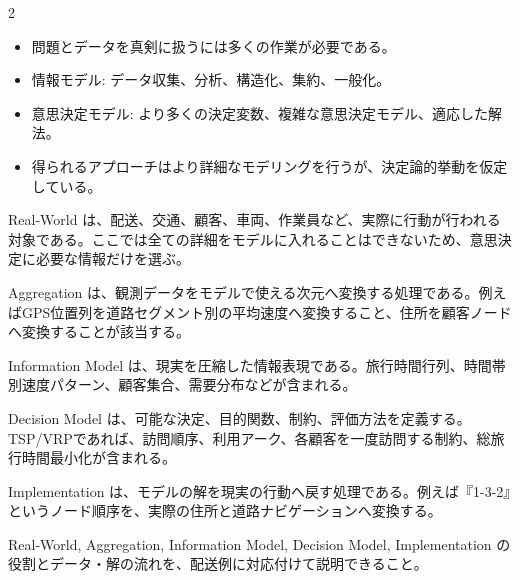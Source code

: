 

\vspace{1.5mm}

\begin{multicols}{2}

\footnotesize

\raggedcolumns


\begin{itemize}
\item 問題とデータを真剣に扱うには多くの作業が必要である。
\item 情報モデル: データ収集、分析、構造化、集約、一般化。
\item 意思決定モデル: より多くの決定変数、複雑な意思決定モデル、適応した解法。
\item 得られるアプローチはより詳細なモデリングを行うが、決定論的挙動を仮定している。
\end{itemize}

Real-World は、配送、交通、顧客、車両、作業員など、実際に行動が行われる対象である。ここでは全ての詳細をモデルに入れることはできないため、意思決定に必要な情報だけを選ぶ。\par

Aggregation は、観測データをモデルで使える次元へ変換する処理である。例えばGPS位置列を道路セグメント別の平均速度へ変換すること、住所を顧客ノードへ変換することが該当する。\par

Information Model は、現実を圧縮した情報表現である。旅行時間行列、時間帯別速度パターン、顧客集合、需要分布などが含まれる。\par

Decision Model は、可能な決定、目的関数、制約、評価方法を定義する。TSP/VRPであれば、訪問順序、利用アーク、各顧客を一度訪問する制約、総旅行時間最小化が含まれる。\par

Implementation は、モデルの解を現実の行動へ戻す処理である。例えば『1-3-2』というノード順序を、実際の住所と道路ナビゲーションへ変換する。\par

Real-World, Aggregation, Information Model, Decision Model, Implementation の役割とデータ・解の流れを、配送例に対応付けて説明できること。\par


\end{multicols}

